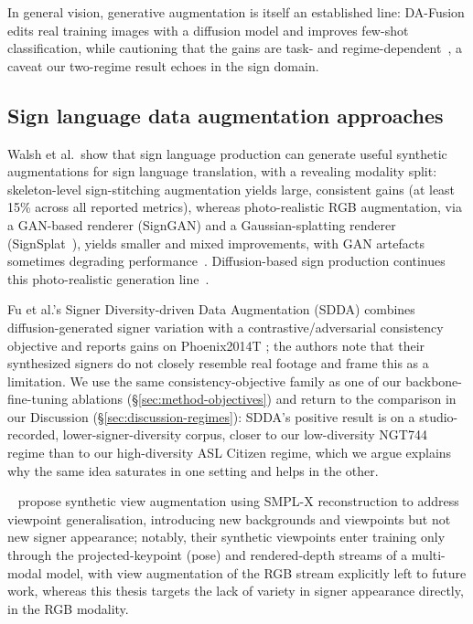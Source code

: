 In general vision, generative augmentation is itself an established
line: DA-Fusion edits real training images with a diffusion model and
improves few-shot classification, while cautioning that the gains are
task- and regime-dependent~\cite{trabuccoEffectiveDataAugmentation2024},
a caveat our two-regime result echoes in the sign domain.

\subsection{Sign language data augmentation approaches}
Walsh et al.\ show that sign language production can generate useful
synthetic augmentations for sign language translation, with a revealing
modality split: skeleton-level sign-stitching augmentation yields large,
consistent gains (at least 15\% across all reported metrics), whereas
photo-realistic RGB augmentation, via a GAN-based renderer (SignGAN) and
a Gaussian-splatting renderer
(SignSplat~\cite{ivashechkinSignSplatRenderingSign2025}), yields smaller
and mixed improvements, with GAN artefacts sometimes degrading
performance~\cite{walshUsingSignLanguage2025}. Diffusion-based sign
production continues this photo-realistic generation
line~\cite{SignDiff}.

Fu et al.'s Signer Diversity-driven Data Augmentation (SDDA) combines
diffusion-generated signer variation with a contrastive/adversarial
consistency objective and reports gains on
Phoenix2014T \cite{fuSignerDiversitydrivenData2024b}; the authors note that
their synthesized signers do not closely resemble real footage and frame
this as a limitation. We use the same consistency-objective family as one of
our backbone-fine-tuning ablations (\S\ref{sec:method-objectives}) and
return to the comparison in our Discussion (\S\ref{sec:discussion-regimes}):
SDDA's positive result is on a studio-recorded, lower-signer-diversity
corpus, closer to our low-diversity NGT744 regime than to our high-diversity ASL Citizen
regime, which we argue explains why the same idea saturates in one setting
and helps in the other.

~\citet{pengSyntheticViewAugmentation2025a} propose synthetic view augmentation using SMPL-X reconstruction
to address viewpoint generalisation, introducing new backgrounds and
viewpoints but not new signer
appearance; notably, their
synthetic viewpoints enter training only through the projected-keypoint
(pose) and rendered-depth streams of a multi-modal model, with view
augmentation of the RGB stream explicitly left to future work, whereas
this thesis targets the lack of variety in signer appearance directly, in
the RGB modality.

